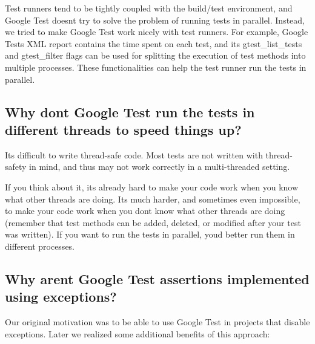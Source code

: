 Test runners tend to be tightly coupled with the build/test environment, and Google Test doesn\textquotesingle{}t try to solve the problem of running tests in parallel. Instead, we tried to make Google Test work nicely with test runners. For example, Google Test\textquotesingle{}s X\+ML report contains the time spent on each test, and its {\ttfamily gtest\+\_\+list\+\_\+tests} and {\ttfamily gtest\+\_\+filter} flags can be used for splitting the execution of test methods into multiple processes. These functionalities can help the test runner run the tests in parallel.

\subsection*{Why don\textquotesingle{}t Google Test run the tests in different threads to speed things up?}

It\textquotesingle{}s difficult to write thread-\/safe code. Most tests are not written with thread-\/safety in mind, and thus may not work correctly in a multi-\/threaded setting.

If you think about it, it\textquotesingle{}s already hard to make your code work when you know what other threads are doing. It\textquotesingle{}s much harder, and sometimes even impossible, to make your code work when you don\textquotesingle{}t know what other threads are doing (remember that test methods can be added, deleted, or modified after your test was written). If you want to run the tests in parallel, you\textquotesingle{}d better run them in different processes.

\subsection*{Why aren\textquotesingle{}t Google Test assertions implemented using exceptions?}

Our original motivation was to be able to use Google Test in projects that disable exceptions. Later we realized some additional benefits of this approach\+:


